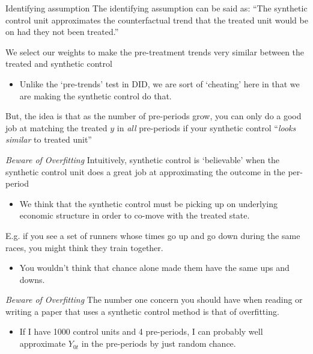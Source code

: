 \documentclass[aspectratio=169,t,11pt,table]{beamer}
\begin{document}

\begin{frame}{Identifying assumption}
  The identifying assumption can be said as:
  ``The synthetic control unit approximates the counterfactual trend that the treated unit would be on had they not been treated.''

  \bigskip
  We select our weights to make the pre-treatment trends very similar between the treated and synthetic control 
  \begin{itemize}
    \item Unlike the `pre-trends' test in DID, we are sort of `cheating' here in that we are making the synthetic control do that.
  \end{itemize}

  \pause
  \bigskip
  But, the idea is that as the number of pre-periods grow, you can only do a good job at matching the treated $y$ in \emph{all} pre-periods if your synthetic control ``\emph{looks similar} to treated unit''
\end{frame}

\begin{frame}{\emph{Beware of Overfitting}}
  Intuitively, synthetic control is `believable' when the synthetic control unit does a great job at approximating the outcome in the per-period
  \begin{itemize}
    \item We think that the synthetic control must be picking up on underlying economic structure in order to co-move with the treated state.
  \end{itemize}

  \bigskip
  E.g. if you see a set of runners whose times go up and go down during the same races, you might think they train together. 
  \begin{itemize}
    \item You wouldn't think that chance alone made them have the same ups and downs.
  \end{itemize}
\end{frame}

\begin{frame}{\emph{Beware of Overfitting}}
  The number one concern you should have when reading or writing a paper that uses a synthetic control method is that of overfitting. 
  \begin{itemize}
    \item If I have 1000 control units and 4 pre-periods, I can probably well approximate $Y_{0t}$ in the pre-periods by just random chance. 
  \end{itemize}
\end{frame}
\end{document}
